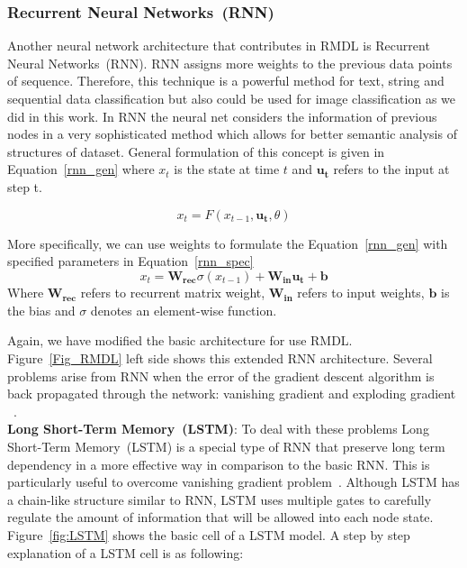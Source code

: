 \documentclass[sigconf, final]{acmart}
\begin{document}
\subsubsection{Recurrent Neural Networks~(RNN)}\label{subsubsec:RNN}
Another neural network architecture that contributes in RMDL is Recurrent Neural Networks~(RNN). RNN assigns more weights to the previous data points of sequence. Therefore, this technique is a powerful method for text, string and sequential data classification but also  could be used for image classification as we did in this work. In RNN the neural net considers the information of previous nodes in a very sophisticated method which allows for better semantic analysis of structures of dataset. General formulation of this concept is given in Equation~\ref{rnn_gen} where $x_t$ is the state at time $t$ and $\boldsymbol{u_t}$ refers to the input at step t.

\begin{equation}
\label{rnn_gen}
x_{t}=F(x_{t-1},\boldsymbol{u_t},\theta)
\end{equation}

More specifically, we can use weights to formulate the Equation~\ref{rnn_gen} with  specified parameters in Equation~\ref{rnn_spec}\begin{equation}\label{rnn_spec}
x_{t}=\mathbf{W_{rec}}\sigma(x_{t-1})+\mathbf{W_{in}}\mathbf{u_t}+\mathbf{b}
\end{equation}
Where $\mathbf{W_{rec}}$ refers to recurrent matrix weight, $\mathbf{W_{in}}$ refers to input weights, $\mathbf{b}$ is the bias and $\sigma$ denotes an element-wise function. 

Again, we have modified the basic architecture for use RMDL. Figure~\ref{Fig_RMDL} left side shows this extended RNN architecture. Several problems arise from RNN when the error of the gradient descent algorithm is back propagated through the network: vanishing gradient and exploding gradient ~\cite{bengio1994learning}. \\
\textbf{Long Short-Term Memory~(LSTM)}: To deal with these problems Long Short-Term Memory~(LSTM) is a special type of RNN that preserve long term dependency in a more effective way in comparison to the basic RNN. This is particularly useful to overcome vanishing gradient problem~\cite{pascanu2013difficulty}. Although LSTM has a chain-like structure similar to RNN,
LSTM uses multiple gates to carefully regulate the amount of information that will be allowed into each node state. Figure~\ref{fig:LSTM} shows the basic cell of a LSTM model. A step by step explanation of a LSTM cell is as following:
\end{document}
